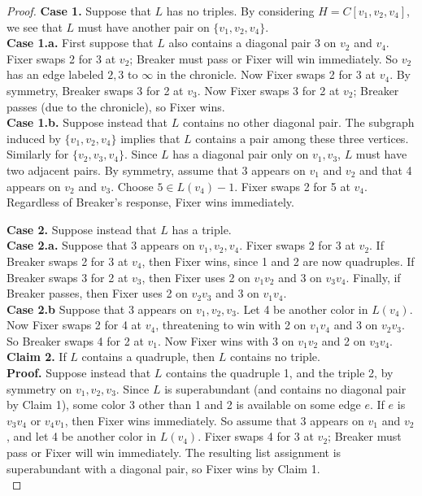 \documentclass[12pt,reqno]{amsart}
\theoremstyle{plain}
\theoremstyle{definition}
\theoremstyle{remark}
\begin{document}
\begin{proof}
\noindent
\textbf{Case 1.}  Suppose that $L$ has no triples.  By considering $H=C[v_1,v_2,v_4]$,
we see that $L$ must have another pair on $\{v_1,v_2,v_4\}$. \\ 
\textbf{Case 1.a.}  First suppose that $L$ also contains a diagonal pair 3 on
$v_2$ and
$v_4$.  Fixer swaps 2 for 3 at $v_2$; Breaker must pass or Fixer will win
immediately.  So $v_2$ has an edge labeled $2,3$ to $\infty$ in the chronicle.
Now Fixer swaps 2 for 3 at $v_4$.  By symmetry, Breaker swaps 3 for 2 at $v_3$.
Now Fixer swaps 3 for 2 at $v_2$; Breaker passes (due to the chronicle), so
Fixer wins.\\
\textbf{Case 1.b.}  Suppose instead that $L$ contains no other diagonal
pair.  The subgraph induced by $\{v_1,v_2,v_4\}$ implies that $L$ contains
a pair among these three vertices.  Similarly for $\{v_2,v_3,v_4\}$.  Since $L$
has a diagonal pair only on $v_1,v_3$, $L$ must have two adjacent pairs.
By symmetry, assume that 3 appears on $v_1$ and $v_2$ and that 4 appears on
$v_2$ and $v_3$.  Choose $5 \in L(v_4)-1$.  Fixer swaps 2 for 5
at $v_4$.  Regardless of Breaker's response, Fixer wins immediately.

\noindent
\textbf{Case 2.}  Suppose instead that $L$ has a triple.\\
\textbf{Case 2.a.} Suppose that 3 appears on $v_1,v_2,v_4$.  Fixer swaps 2 for 3
at $v_2$.  If Breaker swaps 2 for 3 at $v_4$, then Fixer wins, since 1 and 2 are
now quadruples.  If Breaker swaps 3 for 2 at $v_3$, then Fixer uses 2 on
$v_1v_2$ and 3 on $v_3v_4$.  Finally, if Breaker passes, then Fixer uses 2 on
$v_2v_3$ and 3 on $v_1v_4$.\\
\textbf{Case 2.b} Suppose that 3 appears on $v_1,v_2,v_3$.  Let 4 be another
color in $L(v_4)$.  Now Fixer swaps 2 for 4 at $v_4$, threatening to win with 2
on $v_1v_4$ and 3 on $v_2v_3$.  So Breaker swaps 4 for 2 at $v_1$.  Now Fixer
wins with 3 on $v_1v_2$ and 2 on $v_3v_4$.\\


\noindent
\textbf{Claim 2.}  If $L$ contains a quadruple, then $L$ contains no triple.\\
\textbf{Proof.}
Suppose instead that $L$ contains the quadruple 1, and the triple 2, by symmetry
on $v_1,v_2,v_3$.  %
Since $L$ is superabundant (and contains no diagonal pair by Claim 1), some
color 3 other than 1 and 2 is available on some edge $e$.  If $e$ is $v_3v_4$ or
$v_4v_1$, then Fixer wins immediately.  So assume that 3 appears on $v_1$ and
$v_2$, and let 4 be another color in $L(v_4)$.  Fixer swaps 4 for 3 at $v_2$;
Breaker must pass or Fixer will win immediately.  The resulting list assignment
is superabundant with a diagonal pair, so Fixer wins by Claim 1.
\\


\end{proof}
\end{document}

